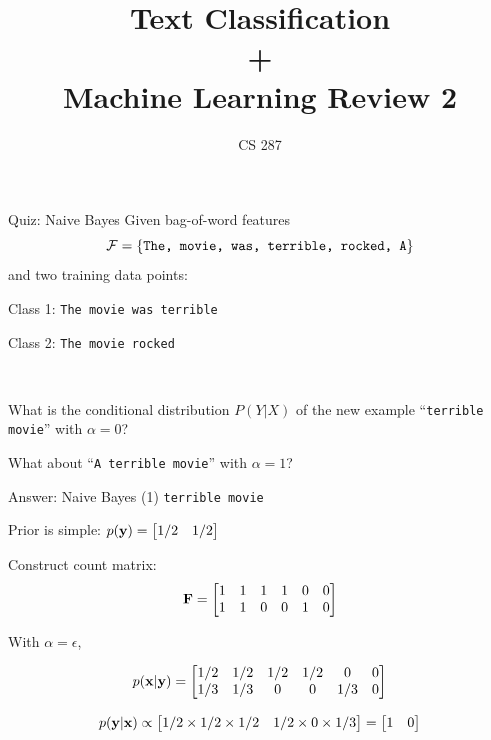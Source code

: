 \documentclass{beamer}
\title{Text Classification\\ + \\ Machine Learning Review 2 }
\date{}
\author{CS 287}
\begin{document}
\begin{frame}
  \titlepage
\end{frame}



\begin{frame}{Quiz: Naive Bayes}
  Given bag-of-word features \[\mathcal{F} = \{\mathrm{\texttt{The, movie, was, terrible, rocked, A}} \}\] and two training data points:
    
  \begin{center}
    Class 1: \texttt{The movie was terrible}
  
    Class 2: \texttt{The movie rocked}
  \end{center}
  \\

  \air 

  What is the conditional distribution $P(Y | X)$ of the new example ``\texttt{terrible movie}''  with $\alpha =0$?


  \air 

  What about ``\texttt{A terrible movie}'' with $\alpha =1$?

\end{frame}

\begin{frame}{Answer: Naive Bayes (1) }
  \texttt{terrible movie}
  \air 

  Prior is simple: $p(\mathbf{y}) =  \begin{bmatrix} 1/2 & 1/2 \end{bmatrix}$  

  Construct count matrix:
  \[ \mathbf{F} =
    \begin{bmatrix}
      1 & 1 & 1 & 1 & 0 & 0 \\
      1 & 1 & 0 & 0 & 1 & 0 \\
    \end{bmatrix}
  \] 
  
  With $\alpha = \epsilon$,

  \[ p(\mathbf{x} | \mathbf{y}) =     \begin{bmatrix}
      1/2 & 1/2 & 1/2 & 1/2 & 0 & 0 \\
      1/3 & 1/3 & 0 & 0 & 1/3 & 0 \\
    \end{bmatrix} 
  \]

  \[ p(\mathbf{y} | \mathbf{x}) \propto \begin{bmatrix} 1/2 \times 1/2 \times 1/2 &  1/2 \times 0 \times 1/3  \end{bmatrix} = \begin{bmatrix} 1 &  0 \end{bmatrix}  \]

\end{frame}
  
\end{document}
